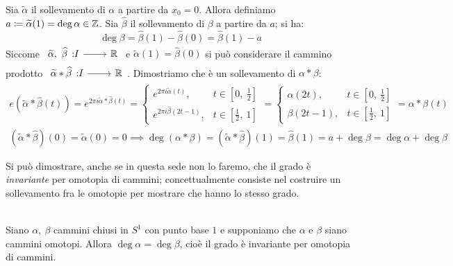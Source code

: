 \begin{demonstration}
	Sia $\widetilde{\alpha}$ il sollevamento di $\alpha$ a partire da $x_0=0$. Allora definiamo $a\coloneqq \widetilde{\alpha}(1)=\deg\alpha\in\mathbb{Z}$. Sia $\widehat{\beta}$ il sollevamento di $\beta$ a partire da $a$; si ha:
	\begin{equation*}
		\deg\beta=\widehat{\beta}(1)-\widehat{\beta}(0)=\widehat{\beta}(1)-a
	\end{equation*}
	Siccome $\funz {\widetilde{\alpha},\ \widehat{\beta}} I \realset$ e $\widetilde{\alpha}(1)=\widehat{\beta}(0)$ si può considerare il cammino prodotto $\funz {\widetilde{\alpha}\ast\widehat{\beta}} I \realset$. Dimostriamo che è un sollevamento di $\alpha\ast\beta$:
		\begin{gather*}
			e\left( \widetilde{\alpha}\ast\widehat{\beta}(t) \right)= e^{2\pi i \widetilde{\alpha}\ast\widehat{\beta}(t)}=\begin{cases}
				e^{2\pi i \widetilde{\alpha}(t)}, & t\in \left[ 0,\ \frac{1}{2} \right]\\
				e^{2\pi i \widehat{\beta}(2t-1)}, & t\in \left[ \frac{1}{2},\ 1 \right]
			\end{cases}=\begin{cases}
				\alpha(2t), & t\in \left[ 0,\ \frac{1}{2} \right]\\
				\beta(2t-1), & t\in \left[ \frac{1}{2},\ 1 \right]
			\end{cases}= \alpha\ast\beta(t)\\
			(\widetilde{\alpha}\ast\widehat{\beta})(0)=\widetilde{\alpha}(0)=0 \implies \deg(\alpha\ast\beta)=(\widetilde{\alpha}\ast\widehat{\beta})(1)=\widehat{\beta}(1)=a+\deg\beta=\deg\alpha +\deg\beta
		\end{gather*}
\end{demonstration}
Si può dimostrare, anche se in questa sede non lo faremo, che il grado è \textit{invariante} per omotopia di cammini; concettualmente consiste nel costruire un sollevamento fra le omotopie per mostrare che hanno lo stesso grado.
\begin{theorema}~{}\\
	Siano $\alpha,\ \beta$ cammini chiusi in $S^1$ con punto base $1$ e supponiamo che $\alpha$ e $\beta$ siano cammini omotopi. Allora $\deg\alpha=\deg\beta$, cioè il grado è invariante per omotopia di cammini.
\end{theorema}

